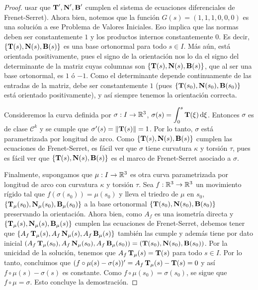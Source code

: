 \begin{teo}
\begin{proof}
usar que $\operatorname{\mathbf{T}}',\operatorname{\mathbf{N}}',\operatorname{\mathbf{B}}'$ cumplen el sistema de ecuaciones diferenciales de Frenet-Serret). Ahora bien, notemos que la función $G(s)=(1,1,1,0,0,0)$ es una solución a ese Problema de Valores Iniciales. Eso implica que las normas deben ser constantemente $1$ y los productos internos constantemente $0$. Es decir, $\{\operatorname{\mathbf{T}}(s),\operatorname{\mathbf{N}}(s),\operatorname{\mathbf{B}}(s)\}$ es una base ortonormal para todo $s\in I$. Más aún, está orientada positivamente, pues el signo de la orientación nos lo da el signo del determinante de la matriz cuyas columnas son $\{\operatorname{\mathbf{T}}(s),\operatorname{\mathbf{N}}(s),\operatorname{\mathbf{B}}(s)\}$, que al ser una base ortonormal, es $1$ ó $-1$. Como el determinante depende continuamente de las entradas de la matriz, debe ser constantemente $1$ (pues $\{\operatorname{\mathbf{T}}(s_0),\operatorname{\mathbf{N}}(s_0),\operatorname{\mathbf{B}}(s_0)\}$ está orientado positivamente), y así siempre tenemos la orientación correcta.

Consideremos la curva definida por $\sigma:I\to\mathbb{R}^3$, $\sigma(s)=\displaystyle\int_{0}^s \operatorname{\mathbf{T}}(\xi)\mathop{}\!\mathrm{d}\xi$. Entonces $\sigma$ es de clase $\mathscr{C}^k$ y se cumple que $\sigma'(s)=\left\| \operatorname{\mathbf{T}}(s) \right\|=1$. Por lo tanto, $\sigma$ está parametrizada por longitud de arco. Como $\{\operatorname{\mathbf{T}}(s),\operatorname{\mathbf{N}}(s),\operatorname{\mathbf{B}}(s)\}$ cumplen las ecuaciones de Frenet-Serret, es fácil ver que $\sigma$ tiene curvatura $\kappa$ y torsión $\tau$, pues es fácil ver que $\{\operatorname{\mathbf{T}}(s),\operatorname{\mathbf{N}}(s),\operatorname{\mathbf{B}}(s)\}$ es el marco de Frenet-Serret asociado a $\sigma$.

Finalmente, supongamos que $\mu:I\to\mathbb{R}^3$ es otra curva parametrizada por longitud de arco con curvatura $\kappa$ y torsión $\tau$. Sea $f:\mathbb{R}^3\to\mathbb{R}^3$ un movimiento rígido tal que $f(\sigma(s_0))=\mu(s_0)$ y lleva el triedro de $\mu$ en $s_0$, $\{\operatorname{\mathbf{T}}_\mu(s_0),\operatorname{\mathbf{N}}_\mu(s_0),\operatorname{\mathbf{B}}_\mu(s_0)\}$ a la base ortonormal $\{\operatorname{\mathbf{T}}(s_0),\operatorname{\mathbf{N}}(s_0),\operatorname{\mathbf{B}}(s_0)\}$ preservando la orientación. Ahora bien, como $A_f$ es una isometría directa y $\{\operatorname{\mathbf{T}}_\mu(s),\operatorname{\mathbf{N}}_\mu(s),\operatorname{\mathbf{B}}_\mu(s)\}$ cumplen las ecuaciones de Frenet-Serret, debemos tener que $\{A_f\operatorname{\mathbf{T}}_\mu(s),A_f\operatorname{\mathbf{N}}_\mu(s),A_f\operatorname{\mathbf{B}}_\mu(s)\}$ también las cumple y además tiene por dato inicial $(A_f\operatorname{\mathbf{T}}_\mu(s_0),A_f\operatorname{\mathbf{N}}_\mu(s_0),A_f\operatorname{\mathbf{B}}_\mu(s_0))=(\operatorname{\mathbf{T}}(s_0),\operatorname{\mathbf{N}}(s_0),\operatorname{\mathbf{B}}(s_0))$. Por la unicidad de la solución, tenemos que $A_f\operatorname{\mathbf{T}}_\mu(s)=\operatorname{\mathbf{T}}(s)$ para todo $s\in I$. Por lo tanto, concluimos que $(f\circ \mu(s) - \sigma(s))' = A_f\operatorname{\mathbf{T}}_\mu(s)-\operatorname{\mathbf{T}}(s) = 0$ y así $f\circ\mu(s)-\sigma(s)$ es constante. Como $f\circ\mu(s_0)=\sigma(s_0)$, se sigue que $f\circ\mu =\sigma$. Esto concluye la demostración.
\end{proof}
\end{teo}

